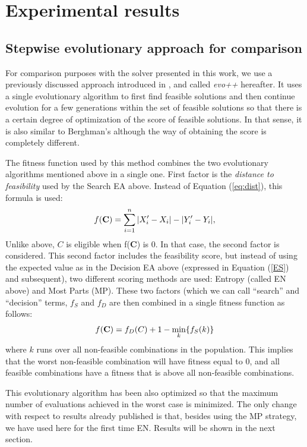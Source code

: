 \section{Experimental results}\label{Experiments}

\subsection{Stepwise evolutionary approach for comparison}
\label{ss:evo}

For comparison purposes with the solver presented in this work, we use a previously discussed approach introduced in \cite{Merelo06}, and called {\em evo++} hereafter. It uses a single evolutionary algorithm to first find feasible
solutions and then continue evolution for a few generations within the
set of feasible solutions so that there is a certain degree of
optimization of the score of feasible solutions. In that sense, it is
also similar to Berghman's although the way of obtaining the score is
completely different.

The fitness function used by this method combines the two evolutionary algorithms
mentioned above in a single one. First factor is the {\em distance to
  feasibility} used by the Search EA above. Instead of Equation (\ref{eq:dist}),
this formula is used:
\begin{equation}
f({\bf C})=\sum_{i=1}^n |X'_i-X_i|-|Y'_i-Y_i|,
\label{eq:dist2}
\end{equation}
Unlike above, $C$ is eligible when f({\bf C}) is 0.
In that case, the second factor is considered. This second factor
includes the feasibility score, but instead of using the expected
value as in the Decision EA above (expressed in Equation (\ref{ES}) and
subsequent), two different scoring methods are used: Entropy (called
EN above) and Most Parts (MP). These two factors (which we can call
``search'' and ``decision'' terms, $f_S$ and $f_D$ are then combined
in a single fitness function as follows:
\[
f({\bf C}) = f_D(C) + 1-\min_k \{f_S(k)\}
\]
where $k$ runs over all non-feasible combinations in the
population. This implies that the worst non-feasible combination will
have fitness equal to 0, and all feasible combinations have a fitness
that is above all non-feasible combinations.

This evolutionary algorithm has been also optimized so that the
maximum number of evaluations achieved in the worst case is
minimized. The only change with respect to results already published
is that, besides using the MP strategy, we have used here for the
first time EN. Results will be shown in the next section.

